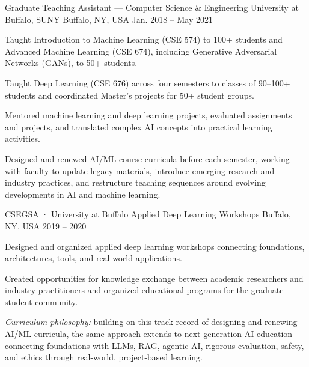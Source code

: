 
\begin{cventries}

\cventry
{Graduate Teaching Assistant — Computer Science \& Engineering}
{University at Buffalo, SUNY}
{Buffalo, NY, USA}
{Jan. 2018 – May 2021}
{%
\begin{cvitems}
\item{Taught Introduction to Machine Learning (CSE 574) to 100+ students and Advanced Machine Learning (CSE 674), including Generative Adversarial Networks (GANs), to 50+ students.}
\item{Taught Deep Learning (CSE 676) across four semesters to classes of 90–100+ students and coordinated Master's projects for 50+ student groups.}
\item{Mentored machine learning and deep learning projects, evaluated assignments and projects, and translated complex AI concepts into practical learning activities.}
\item{Designed and renewed AI/ML course curricula before each semester, working with faculty to update legacy materials, introduce emerging research and industry practices, and restructure teaching sequences around evolving developments in AI and machine learning.}
\end{cvitems}%
}

\cventry
{CSEGSA · University at Buffalo}
{Applied Deep Learning Workshops}
{Buffalo, NY, USA}
{2019 – 2020}
{%
\begin{cvitems}
\item{Designed and organized applied deep learning workshops connecting foundations, architectures, tools, and real-world applications.}
\item{Created opportunities for knowledge exchange between academic researchers and industry practitioners and organized educational programs for the graduate student community.}
\end{cvitems}%
}

\begin{cvparagraph}
{\textit{Curriculum philosophy:} building on this track record of designing and renewing AI/ML curricula, the same approach extends to next-generation AI education -- connecting foundations with LLMs, RAG, agentic AI, rigorous evaluation, safety, and ethics through real-world, project-based learning.}
\end{cvparagraph}

\end{cventries}